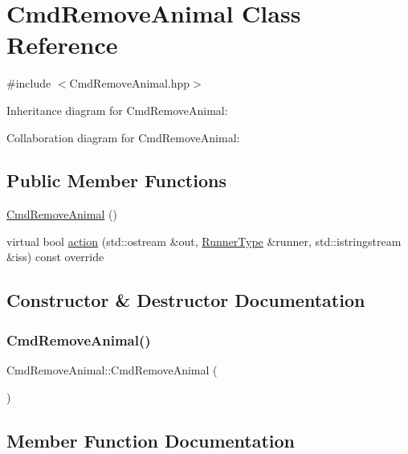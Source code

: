 \hypertarget{classCmdRemoveAnimal}{}\section{Cmd\+Remove\+Animal Class Reference}
\label{classCmdRemoveAnimal}


{\ttfamily \#include $<$Cmd\+Remove\+Animal.\+hpp$>$}



Inheritance diagram for Cmd\+Remove\+Animal\+:


Collaboration diagram for Cmd\+Remove\+Animal\+:
\subsection*{Public Member Functions}
\begin{DoxyCompactItemize}
\item 
\hyperlink{classCmdRemoveAnimal_ac7702f06507f52d7e62aaf70a894cb13}{Cmd\+Remove\+Animal} ()
\item 
virtual bool \hyperlink{classCmdRemoveAnimal_aac8fb67ec5515e686ff16b1a495c5b80}{action} (std\+::ostream \&out, \hyperlink{Command_8hpp_a3594ceaf3c835811a9a67810e7af19f9}{Runner\+Type} \&runner, std\+::istringstream \&iss) const override
\end{DoxyCompactItemize}


\subsection{Constructor \& Destructor Documentation}
\mbox{\label{classCmdRemoveAnimal_ac7702f06507f52d7e62aaf70a894cb13}} 
\subsubsection{\texorpdfstring{Cmd\+Remove\+Animal()}{CmdRemoveAnimal()}}
{\footnotesize\ttfamily Cmd\+Remove\+Animal\+::\+Cmd\+Remove\+Animal (\begin{DoxyParamCaption}{ }\end{DoxyParamCaption})}



\subsection{Member Function Documentation}
\mbox{\label{classCmdRemoveAnimal_aac8fb67ec5515e686ff16b1a495c5b80}} 
